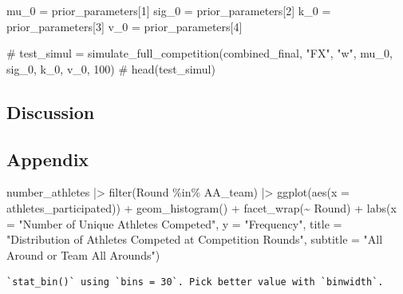 \documentclass[
  letterpaper,
  DIV=11,
  numbers=noendperiod]{scrartcl}
\newenvironment{Shaded}{\begin{snugshade}}{\end{snugshade}}
\newcommand{\AttributeTok}[1]{\textcolor[rgb]{0.40,0.45,0.13}{#1}}
\newcommand{\CommentTok}[1]{\textcolor[rgb]{0.37,0.37,0.37}{#1}}
\newcommand{\DecValTok}[1]{\textcolor[rgb]{0.68,0.00,0.00}{#1}}
\newcommand{\FunctionTok}[1]{\textcolor[rgb]{0.28,0.35,0.67}{#1}}
\newcommand{\NormalTok}[1]{\textcolor[rgb]{0.00,0.23,0.31}{#1}}
\newcommand{\OtherTok}[1]{\textcolor[rgb]{0.00,0.23,0.31}{#1}}
\newcommand{\SpecialCharTok}[1]{\textcolor[rgb]{0.37,0.37,0.37}{#1}}
\newcommand{\StringTok}[1]{\textcolor[rgb]{0.13,0.47,0.30}{#1}}
\begin{document}
\begin{Shaded}
\begin{Highlighting}[]
\NormalTok{mu\_0 }\OtherTok{=}\NormalTok{ prior\_parameters[}\DecValTok{1}\NormalTok{]}
\NormalTok{sig\_0 }\OtherTok{=}\NormalTok{ prior\_parameters[}\DecValTok{2}\NormalTok{]}
\NormalTok{k\_0 }\OtherTok{=}\NormalTok{ prior\_parameters[}\DecValTok{3}\NormalTok{]}
\NormalTok{v\_0 }\OtherTok{=}\NormalTok{ prior\_parameters[}\DecValTok{4}\NormalTok{]}

\CommentTok{\# test\_simul = simulate\_full\_competition(combined\_final, "FX", "w", mu\_0, sig\_0, k\_0, v\_0, 100)}
\CommentTok{\# head(test\_simul)}
\end{Highlighting}
\end{Shaded}

\hypertarget{discussion}{%
\subsection{Discussion}\label{discussion}}

\hypertarget{appendix}{%
\subsection{Appendix}\label{appendix}}

\begin{Shaded}
\begin{Highlighting}[]
\NormalTok{number\_athletes }\SpecialCharTok{|\textgreater{}}
  \FunctionTok{filter}\NormalTok{(Round }\SpecialCharTok{\%in\%}\NormalTok{ AA\_team) }\SpecialCharTok{|\textgreater{}}
  \FunctionTok{ggplot}\NormalTok{(}\FunctionTok{aes}\NormalTok{(}\AttributeTok{x =}\NormalTok{ athletes\_participated)) }\SpecialCharTok{+}
    \FunctionTok{geom\_histogram}\NormalTok{() }\SpecialCharTok{+}
    \FunctionTok{facet\_wrap}\NormalTok{(}\SpecialCharTok{\textasciitilde{}}\NormalTok{ Round) }\SpecialCharTok{+}
    \FunctionTok{labs}\NormalTok{(}\AttributeTok{x =} \StringTok{"Number of Unique Athletes Competed"}\NormalTok{,}
         \AttributeTok{y =} \StringTok{"Frequency"}\NormalTok{,}
         \AttributeTok{title =} \StringTok{"Distribution of Athletes Competed at Competition Rounds"}\NormalTok{,}
         \AttributeTok{subtitle =} \StringTok{"All Around or Team All Arounds"}\NormalTok{)}
\end{Highlighting}
\end{Shaded}

\begin{verbatim}
`stat_bin()` using `bins = 30`. Pick better value with `binwidth`.
\end{verbatim}
\end{document}
